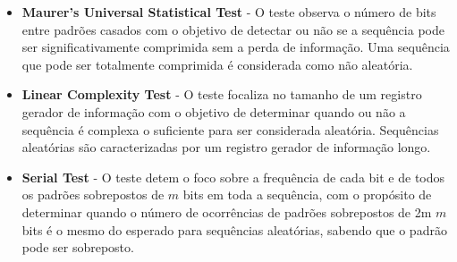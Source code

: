 \begin{itemize}
   \item \textbf{Maurer's Universal Statistical Test} - O teste observa o número de bits entre padrões casados com o objetivo de detectar ou não se a sequência pode ser significativamente comprimida sem a perda de informação. Uma sequência que pode ser totalmente comprimida é considerada como não aleatória.
   \item \textbf{Linear Complexity Test} - O teste focaliza no tamanho de um registro gerador de informação com o objetivo de determinar quando ou não a sequência é complexa o suficiente para ser considerada aleatória. Sequências aleatórias são caracterizadas por um registro gerador de informação longo.
   \item \textbf{Serial Test} - O teste detem o foco sobre a frequência de cada bit e de todos os padrões sobrepostos de $m$ bits em toda a sequência, com o propósito de determinar quando o número de ocorrências de padrões sobrepostos de 2m $m$ bits é o mesmo do esperado para sequências aleatórias, sabendo que o padrão pode ser sobreposto.

\end{itemize}
